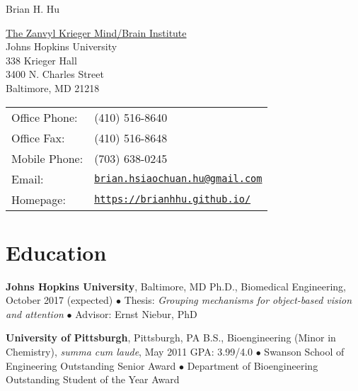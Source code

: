 \documentclass[10pt,letterpaper]{article}
\def\name{Brian H. Hu}
\renewenvironment{itemize}{
  \begin{list}{}{
    \setlength{\leftmargin}{1.5em}
    \setlength{\itemsep}{0.25em}
    \setlength{\parskip}{0pt}
    \setlength{\parsep}{0.25em}
  }
}{
  \end{list}
}
\begin{document}
{\huge \name}


\vspace{0.25in}

\begin{minipage}{0.475\linewidth}
  \href{http://krieger.jhu.edu/mbi/}{The Zanvyl Krieger Mind/Brain Institute} \\
  Johns Hopkins University \\
  338 Krieger Hall \\
  3400 N. Charles Street \\
  Baltimore, MD 21218
\end{minipage}
\begin{minipage}{0.52\linewidth}
  \begin{tabular}{ll}
    Office Phone: & (410) 516-8640 \\
    Office Fax: &  (410) 516-8648 \\
    Mobile Phone: & (703) 638-0245 \\
    Email: & \href{mailto:brian.hsiaochuan.hu@gmail.com}{\tt brian.hsiaochuan.hu@gmail.com} \\
    Homepage: & \href{https://brianhhu.github.io/}{\tt https://brianhhu.github.io/} \\
  \end{tabular}
\end{minipage}

\section*{Education}
\vspace{-0.05in}
\begin{itemize}
  \item \textbf{Johns Hopkins University}, Baltimore, MD
  \subitem Ph.D., Biomedical Engineering, October 2017 (expected)
  \subitem$\bullet$ Thesis: \textit{Grouping mechanisms for object-based vision and attention}
  \subitem$\bullet$ Advisor: Ernst Niebur, PhD
  
  \item \textbf{University of Pittsburgh}, Pittsburgh, PA
  \subitem B.S., Bioengineering (Minor in Chemistry), \textit{summa cum laude}, May 2011
  \subitem GPA: 3.99/4.0
  \vspace{0.05in}
  \subitem$\bullet$ Swanson School of Engineering Outstanding Senior Award
  \subitem$\bullet$ Department of Bioengineering Outstanding Student of the Year Award
\end{itemize}
\end{document}
